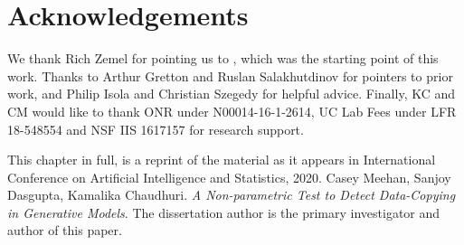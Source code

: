 \section{Acknowledgements}
We thank Rich Zemel for pointing us to \cite{Kilian}, which was the starting point of this work. Thanks to Arthur Gretton and Ruslan Salakhutdinov for pointers to prior work, and Philip Isola and Christian Szegedy for helpful advice. Finally, KC and CM would like to thank  ONR under N00014-16-1-2614,  UC Lab Fees under LFR 18-548554 and NSF IIS 1617157 for research support.

This chapter in full, is a reprint of the material as it appears in International Conference on Artificial Intelligence and Statistics, 2020. Casey Meehan, Sanjoy Dasgupta, Kamalika Chaudhuri. \emph{A Non-parametric Test to Detect Data-Copying in Generative Models}. The dissertation author is the primary investigator and author of this paper. 

